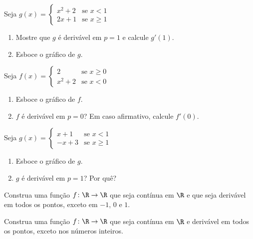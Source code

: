 \begin{exercicio}[15]
\label{ex:7.2.15}
Seja $g(x) = \begin{cases} x^2 + 2 & \text{se } x < 1 \\ 2x + 1 & \text{se } x \ge 1 \end{cases}$
\begin{enumerate}[label=\alph*)]
    \item Mostre que $g$ é derivável em $p = 1$ e calcule $g'(1)$.
    \item Esboce o gráfico de $g$.
\end{enumerate}
\end{exercicio}

\begin{exercicio}[16]
\label{ex:7.2.16}
Seja $f(x) = \begin{cases} 2 & \text{se } x \ge 0 \\ x^2 + 2 & \text{se } x < 0 \end{cases}$
\begin{enumerate}[label=\alph*)]
    \item Esboce o gráfico de $f$.
    \item $f$ é derivável em $p = 0$? Em caso afirmativo, calcule $f'(0)$.
\end{enumerate}
\end{exercicio}

\begin{exercicio}[17]
\label{ex:7.2.17}
Seja $g(x) = \begin{cases} x + 1 & \text{se } x < 1 \\ -x + 3 & \text{se } x \ge 1 \end{cases}$
\begin{enumerate}[label=\alph*)]
    \item Esboce o gráfico de $g$.
    \item $g$ é derivável em $p = 1$? Por quê?
\end{enumerate}
\end{exercicio}

\begin{exercicio}[18]
\label{ex:7.2.18}
Construa uma função $f\colon \R \to \R$ que seja contínua em $\R$ e que seja derivável em todos os pontos, exceto em $-1$, $0$ e $1$.
\end{exercicio}

\begin{exercicio}[19]
\label{ex:7.2.19}
Construa uma função $f\colon \R \to \R$ que seja contínua em $\R$ e derivável em todos os pontos, exceto nos números inteiros.
\end{exercicio}

